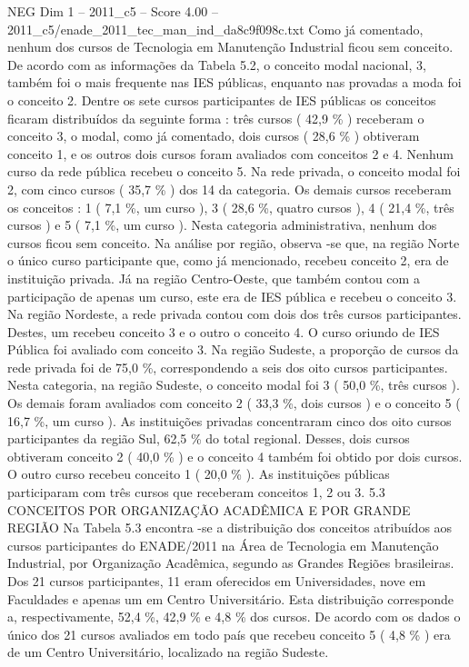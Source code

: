 \begin{textsample}{NEG Dim 1 – 2011\_c5 – Score 4.00 – 2011\_c5/enade\_2011\_tec\_man\_ind\_da8c9f098c.txt}
Como já comentado, nenhum dos cursos de Tecnologia em Manutenção Industrial ficou sem conceito.
De acordo com as informações da Tabela 5.2, o conceito modal nacional, 3, também foi o mais frequente nas IES públicas, enquanto nas provadas a moda foi o conceito 2.
Dentre os sete cursos participantes de IES públicas os conceitos ficaram distribuídos da seguinte forma : três cursos ( 42,9 \% ) receberam o conceito 3, o modal, como já comentado, dois cursos ( 28,6 \% ) obtiveram conceito 1, e os outros dois cursos foram avaliados com conceitos 2 e 4.
Nenhum curso da rede pública recebeu o conceito 5.
Na rede privada, o conceito modal foi 2, com cinco cursos ( 35,7 \% ) dos 14 da categoria.
Os demais cursos receberam os conceitos : 1 ( 7,1 \%, um curso ), 3 ( 28,6 \%, quatro cursos ), 4 ( 21,4 \%, três cursos ) e 5 ( 7,1 \%, um curso ).
Nesta categoria administrativa, nenhum dos cursos ficou sem conceito.
Na análise por região, observa -se que, na região Norte o único curso participante que, como já mencionado, recebeu conceito 2, era de instituição privada.
Já na região Centro-Oeste, que também contou com a participação de apenas um curso, este era de IES pública e recebeu o conceito 3.
Na região Nordeste, a rede privada contou com dois dos três cursos participantes.
Destes, um recebeu conceito 3 e o outro o conceito 4.
O curso oriundo de IES Pública foi avaliado com conceito 3.
Na região Sudeste, a proporção de cursos da rede privada foi de 75,0 \%, correspondendo a seis dos oito cursos participantes.
Nesta categoria, na região Sudeste, o conceito modal foi 3 ( 50,0 \%, três cursos ).
Os demais foram avaliados com conceito 2 ( 33,3 \%, dois cursos ) e o conceito 5 ( 16,7 \%, um curso ).
As instituições privadas concentraram cinco dos oito cursos participantes da região Sul, 62,5 \% do total regional.
Desses, dois cursos obtiveram conceito 2 ( 40,0 \% ) e o conceito 4 também foi obtido por dois cursos.
O outro curso recebeu conceito 1 ( 20,0 \% ).
As instituições públicas participaram com três cursos que receberam conceitos 1, 2 ou 3. 5.3 CONCEITOS POR ORGANIZAÇÃO ACADÊMICA E POR GRANDE REGIÃO Na Tabela 5.3 encontra -se a distribuição dos conceitos atribuídos aos cursos participantes do ENADE/2011 na Área de Tecnologia em Manutenção Industrial, por Organização Acadêmica, segundo as Grandes Regiões brasileiras.
Dos 21 cursos participantes, 11 eram oferecidos em Universidades, nove em Faculdades e apenas um em Centro Universitário.
Esta distribuição corresponde a, respectivamente, 52,4 \%, 42,9 \% e 4,8 \% dos cursos.
De acordo com os dados o único dos 21 cursos avaliados em todo país que recebeu conceito 5 ( 4,8 \% ) era de um Centro Universitário, localizado na região Sudeste.

\end{textsample}
